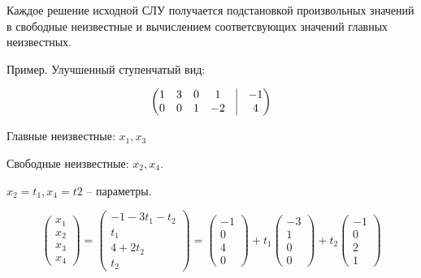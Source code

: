 Каждое решение исходной СЛУ получается подстановкой произвольных значений в свободные неизвестные и вычислением соответсвующих значений главных неизвестных.

\begin{comment}
	И тогда СЛУ имеет бесконечно много решений.
\end{comment}

Пример. Улучшенный ступенчатый вид: 

\begin{equation*}
	\begin{pmatrix}
		1 & 3 & 0 & 1 & \vrule & -1 \\
		0 & 0 & 1 & -2 & \vrule & 4
	\end{pmatrix}
\end{equation*}

Главные неизвестные: $x_1, x_3$

Свободные неизвестные: $x_2, x_4$.

$x_2 = t_1, x_4 = t2$ -- параметры.

\begin{equation*}
	\begin{pmatrix}
    x_1 \\
    x_2 \\
    x_3 \\
    x_4
	\end{pmatrix}
    =
    \begin{pmatrix}
    -1 - 3t_1 - t_2 \\
    t_1 \\
    4 + 2t_2 \\
    t_2
    \end{pmatrix}
    =
    \begin{pmatrix}
    -1\\
    0\\
    4\\
    0
    \end{pmatrix}
    + t_1
    \begin{pmatrix}
    -3\\
    1\\
    0\\
    0
    \end{pmatrix}
    +t_2
    \begin{pmatrix}
    -1\\
    0\\
    2\\
    1
    \end{pmatrix}
\end{equation*}

